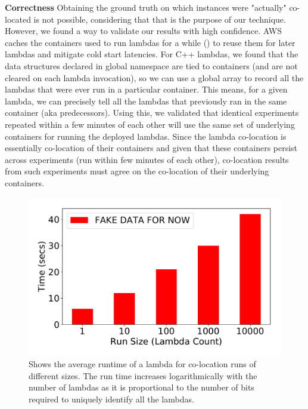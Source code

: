 \textbf{Correctness} Obtaining the ground truth on which instances were 
"actually" co-located is not possible, 
considering that that is the purpose of our technique. However, we found a way to 
validate our results with high confidence. AWS caches the containers used to run 
lambdas for a while () to reuse them\cite{awscontainerreuse} for later lambdas and mitigate cold start latencies. For C++ lambdas, we found that the data structures declared in
global namespace are tied to containers (and are not cleared on each lambda invocation),
so we can use a global array to record all the 
lambdas that were ever run in a particular container. This means, for a given lambda, we can 
precisely tell all the lambdas that previously ran in the same container (aka predecessors).
Using this, we validated that identical experiments repeated within a few minutes of each 
other will use the same set of underlying containers for running the deployed lambdas.
Since the lambda co-location is essentially co-location of their containers and given that 
these containers persist across experiments (run within few minutes of each other), co-location 
results from such experiments must agree on the co-location of their underlying
containers. 




\begin{figure}[!t]
  \includegraphics[width=.99\linewidth]{fig/runtimes.pdf}
  \caption{Shows the average runtime of a lambda for co-location runs of different sizes. 
  The run time increases logarithmically with the number of lambdas as it is proportional to
  the number of bits required to uniquely identify all the lambdas. 
\label{fig:runtimes}}
\end{figure}



